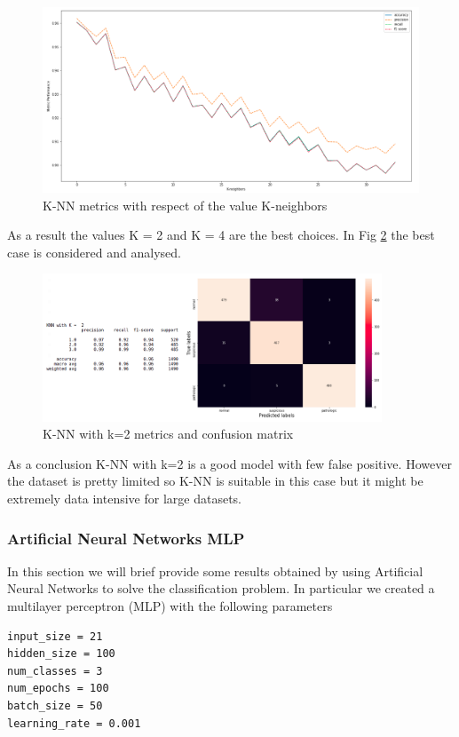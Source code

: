 \documentclass[a4paper,12pt]{article}
\begin{document}
\begin{figure}[H]
  \begin{center}
  \includegraphics[width=1.0\textwidth]{images/knn.png}
  \end{center}
  \caption{K-NN metrics with respect of the value K-neighbors}
  \label{fig:knn}
\end{figure}

\noindent As a result the values K = 2 and K = 4 are the best choices. In Fig \ref{fig:knn2} the best case is considered and analysed.

\begin{figure}[H]
  \begin{center}
  \includegraphics[width=0.9\textwidth]{images/knn2res.png}
  \end{center}
  \caption{K-NN with k=2 metrics and confusion matrix}
  \label{fig:knn2}
\end{figure}


\noindent As a conclusion K-NN with k=2 is a good model with few false positive. However the dataset is pretty limited so K-NN is suitable in this case but it might be extremely data intensive for large datasets.

\subsubsection{Artificial Neural Networks MLP}
In this section we will brief provide some results obtained by using Artificial Neural Networks to solve the classification problem. In particular we created a multilayer perceptron (MLP) with the following parameters
\begin{Verbatim}[fontsize=\small]
input_size = 21
hidden_size = 100
num_classes = 3
num_epochs = 100
batch_size = 50
learning_rate = 0.001
\end{Verbatim} 
\end{document}
